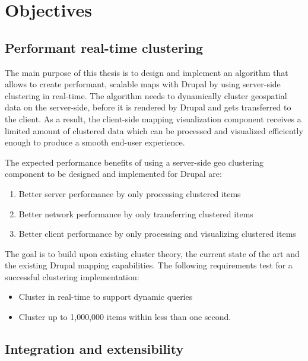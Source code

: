 
%
%

\chapter{Objectives}
\label{chapter:objectives}


\section{Performant real-time clustering}
\label{chapter:objective-performance}

The main purpose of this thesis is to design and implement an algorithm that allows to create performant, scalable maps with Drupal by using server-side clustering in real-time. The algorithm needs to dynamically cluster geospatial data on the server-side, before it is rendered by Drupal and gets transferred to the client. As a result, the client-side mapping visualization component receives a limited amount of clustered data which can be processed and visualized efficiently enough to produce a smooth end-user experience.

The expected performance benefits of using a server-side geo clustering component to be designed and implemented for Drupal are:

\begin{enumerate}

\item Better server performance by only processing clustered items
\item Better network performance by only transferring clustered items 
\item Better client performance by only processing and visualizing clustered items 

\end{enumerate}

The goal is to build upon existing cluster theory, the current state of the art and the existing Drupal mapping capabilities. The following requirements test for a successful clustering implementation:

\begin{itemize}

\item Cluster in real-time to support dynamic queries
\item Cluster up to 1,000,000 items within less than one second.

\end{itemize}


\section{Integration and extensibility}
\label{chapter:objective-integration}

